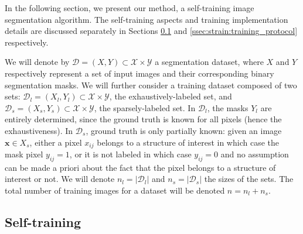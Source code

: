 In the following section, we present our method, a self-training image segmentation algorithm. The self-training aspects and training implementation details are discussed separately in Sections \ref{ssec:strain:self_training} and \ref{ssec:strain:training_protocol} respectively.

We will denote by  $\mathcal{D} = \left(X, Y\right) \subset \mathcal{X} \times \mathcal{Y}$ a segmentation dataset, where $X$ and $Y$ respectively represent a set of input images and their corresponding binary segmentation masks. We will further consider a training dataset composed of two sets: $\mathcal{D}_l = \left(X_l, Y_l\right) \subset \mathcal{X} \times \mathcal{Y}$, the exhaustively-labeled set, and $\mathcal{D}_s = \left(X_s, Y_s\right) \subset \mathcal{X} \times \mathcal{Y}$, the sparsely-labeled set. In $\mathcal{D}_l$, the masks $Y_l$ are entirely determined, since the ground truth is known for all pixels (hence the exhaustiveness). In $\mathcal{D}_s$, ground truth is only partially known: given an image $\mathbf{x} \in X_s$, either a pixel $x_{ij}$ belongs to a structure of interest in which case the mask pixel $y_{ij} = 1$, or it is not labeled in which case $y_{ij} = 0$ and no assumption can be made a priori about the fact that the pixel belongs to a structure of interest or not. We will denote $n_l = |\mathcal{D}_l|$ and $n_s = |\mathcal{D}_s|$ the sizes of the sets. The total number of training images for a dataset will be denoted $n = n_l + n_s$.


\subsection{Self-training}
\label{ssec:strain:self_training}
 
